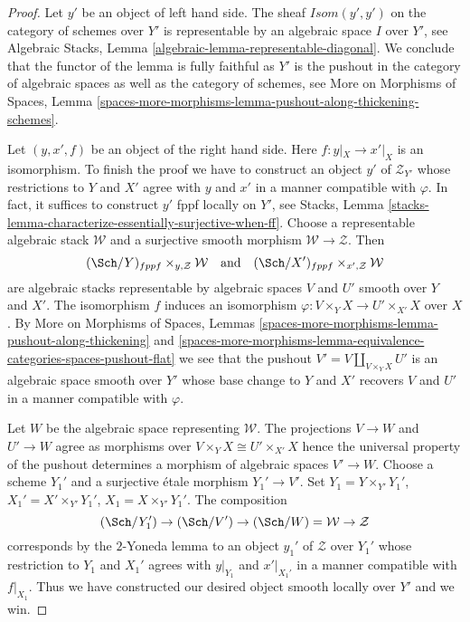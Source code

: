 \begin{proof}
Let $y'$ be an object of left hand side. The sheaf
$\mathit{Isom}(y', y')$ on the category of schemes over $Y'$
is representable by an algebraic space $I$ over $Y'$, see
Algebraic Stacks, Lemma \ref{algebraic-lemma-representable-diagonal}.
We conclude that the functor of the lemma is fully faithful as
$Y'$ is the pushout in the category of algebraic spaces as
well as the category of schemes, see
More on Morphisms of Spaces, Lemma
\ref{spaces-more-morphisms-lemma-pushout-along-thickening-schemes}.

\medskip\noindent
Let $(y, x', f)$ be an object of the right hand side. Here $f : y|_X \to x'|_X$
is an isomorphism. To finish the proof we have to construct an object $y'$ of
$\mathcal{Z}_{Y'}$ whose restrictions to $Y$ and $X'$ agree with $y$ and $x'$
in a manner compatible with $\varphi$. In fact, it suffices to construct $y'$
fppf locally on $Y'$, see
Stacks, Lemma \ref{stacks-lemma-characterize-essentially-surjective-when-ff}.
Choose a representable algebraic stack
$\mathcal{W}$ and a surjective smooth morphism $\mathcal{W} \to \mathcal{Z}$.
Then
$$
(\Sch/Y)_{fppf} \times_{y, \mathcal{Z}} \mathcal{W}
\quad\text{and}\quad
(\Sch/X')_{fppf} \times_{x', \mathcal{Z}} \mathcal{W}
$$
are algebraic stacks representable by algebraic spaces $V$ and $U'$
smooth over $Y$ and $X'$. The isomorphism $f$ induces an isomorphism
$\varphi : V \times_Y X \to U' \times_{X'} X$ over $X$. By
More on Morphisms of Spaces, Lemmas
\ref{spaces-more-morphisms-lemma-pushout-along-thickening} and
\ref{spaces-more-morphisms-lemma-equivalence-categories-spaces-pushout-flat}
we see that the pushout $V' = V \amalg_{V \times_Y X} U'$ is
an algebraic space smooth over $Y'$ whose base change to
$Y$ and $X'$ recovers $V$ and $U'$ in a manner compatible with $\varphi$.

\medskip\noindent
Let $W$ be the algebraic space representing $\mathcal{W}$.
The projections $V \to W$ and $U' \to W$ agree as morphisms
over $V \times_Y X \cong U' \times_{X'} X$ hence the universal
property of the pushout determines a morphism of algebraic spaces
$V' \to W$. Choose a scheme $Y_1'$ and a surjective \'etale morphism
$Y_1' \to V'$. Set $Y_1 = Y \times_{Y'} Y_1'$,
$X_1' = X' \times_{Y'} Y_1'$, $X_1 = X \times_{Y'} Y_1'$.
The composition
$$
(\Sch/Y_1') \to (\Sch/V') \to (\Sch/W) = \mathcal{W} \to \mathcal{Z}
$$
corresponds by the $2$-Yoneda lemma to an object $y_1'$ of $\mathcal{Z}$
over $Y_1'$ whose restriction to $Y_1$ and $X_1'$ agrees with $y|_{Y_1}$
and $x'|_{X_1'}$ in a manner compatible with $f|_{X_1}$. Thus we have
constructed our desired object smooth locally over $Y'$ and we win.
\end{proof}








